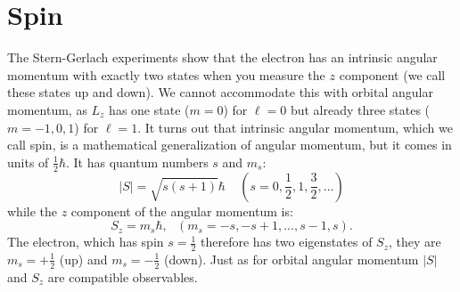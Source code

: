 \documentclass[12pt]{article}
\begin{document}
\section{Spin}

The Stern-Gerlach experiments show that the electron has an intrinsic angular momentum with exactly two states when you  measure the $z$ component (we call these states up and down).  We cannot accommodate this with orbital angular momentum, as $L_z$ has one state ($m=0$) for $\ell=0$ but already three states ($m=-1,0,1$) for $\ell=1$.
It turns out that intrinsic angular momentum, which we call spin, is a mathematical generalization of angular momentum, but it comes in units of $\frac{1}{2} \hbar$.  It has quantum numbers $s$ and $m_s$:
\begin{equation*}
|S| = \sqrt{s (s + 1)} \hbar ~~~~~(s=0,\frac{1}{2},1,\frac{3}{2},...)
\end{equation*}
while the $z$ component of the angular momentum is:
\begin{equation*}
S_z = m_s \hbar, ~~~(m_s=-s, -s+1, ..., s-1, s).
\end{equation*}
The electron, which has spin $s=\frac{1}{2}$ therefore has two eigenstates of $S_z$, they are $m_s = +\frac{1}{2}$ (up) and $m_s = -\frac{1}{2}$ (down).
Just as for orbital angular momentum $|S|$ and $S_z$ are compatible observables.
\end{document}
